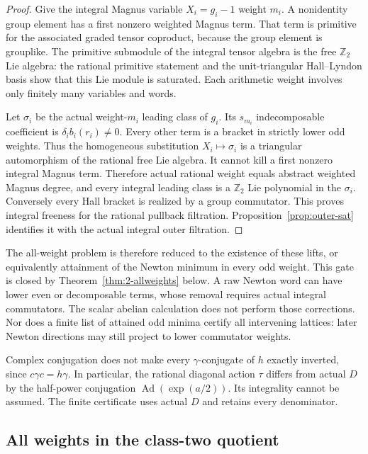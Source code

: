 \documentclass[11pt,a4paper]{article}
\theoremstyle{definition}
\begin{document}
\begin{proof}
Give the integral Magnus variable $X_i=g_i-1$ weight $m_i$.
A nonidentity group element has a first nonzero weighted Magnus
term. That term is primitive for the associated graded tensor
coproduct, because the group element is grouplike. The primitive
submodule of the integral tensor algebra is the free
$\mathbb Z_2$ Lie algebra: the rational primitive statement and
the unit-triangular Hall--Lyndon basis show that this Lie module
is saturated. Each arithmetic weight involves only finitely
many variables and words.

Let $\sigma_i$ be the actual weight-$m_i$ leading class of
$g_i$. Its $s_{m_i}$ indecomposable coefficient is
$\delta_i b_i(r_i)\ne0$. Every other term is a bracket in
strictly lower odd weights. Thus the homogeneous substitution
$X_i\mapsto\sigma_i$ is a triangular automorphism of the
rational free Lie algebra. It cannot kill a first nonzero
integral Magnus term. Therefore actual rational weight equals
abstract weighted Magnus degree, and every integral leading
class is a $\mathbb Z_2$ Lie polynomial in the $\sigma_i$.
Conversely every Hall bracket is realized by a group
commutator. This proves integral freeness for the rational
pullback filtration. Proposition~\ref{prop:outer-sat} identifies
it with the actual integral outer filtration.
\end{proof}

The all-weight problem is therefore reduced to the existence
of these lifts, or equivalently attainment of the Newton
minimum in every odd weight. This gate is closed by
Theorem~\ref{thm:2-allweights} below. A raw Newton word can have lower
even or decomposable terms, whose removal requires actual
integral commutators. The scalar abelian calculation does not
perform those corrections. Nor does a finite list of attained
odd minima certify all intervening lattices: later Newton
directions may still project to lower commutator weights.

Complex conjugation does not make every $\gamma$-conjugate of
$h$ exactly inverted, since $c\gamma c=h\gamma$. In particular,
the rational diagonal action $\tau$ differs from actual $D$ by
the half-power conjugation $\operatorname{Ad}(\exp(a/2))$.
Its integrality cannot be assumed. The finite certificate uses
actual $D$ and retains every denominator.

\subsection{All weights in the class-two quotient}
\end{document}
